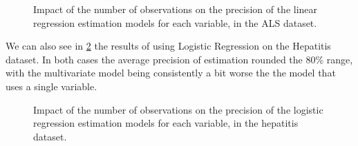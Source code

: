 \begin{figure}
	\begin{subfigmatrix}{2}
  \end{subfigmatrix}
  \caption{Impact of the number of observations on the precision of the linear regression estimation models for each variable, in the ALS dataset.}
  \label{fig:estimationals}
\end{figure}

We can also see in \ref{fig:estimationlogh} the results of using Logistic Regression on the
 Hepatitis dataset. In both cases the average precision of estimation rounded the 80\% range, with the multivariate model being consistently
 a bit worse the the model that uses a single variable.
 
 \begin{figure}
	\begin{subfigmatrix}{2}
  \end{subfigmatrix}
  \caption{Impact of the number of observations on the precision of the logistic regression estimation models for each variable, in the hepatitis dataset.}
  \label{fig:estimationlogh}
\end{figure}


